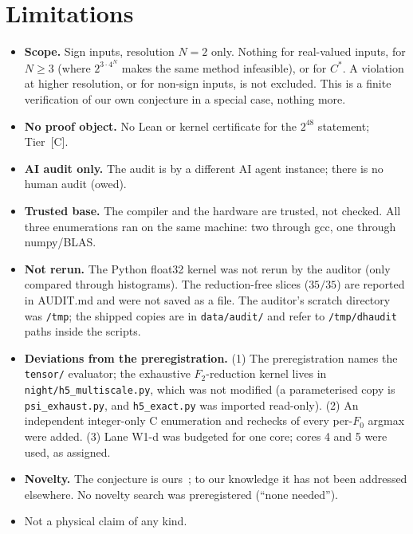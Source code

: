 \documentclass[10pt]{article}
\newcommand{\tier}[1]{\textsf{[#1]}}
\newcommand{\tC}{\tier{C}}
\begin{document}
\section{Limitations}\label{sec:lim}
\begin{itemize}\itemsep=1pt
\item \textbf{Scope.} Sign inputs, resolution $N=2$ only. Nothing for real-valued inputs, for $N\ge3$ (where $2^{3\cdot4^N}$ makes the same method infeasible), or for $C^\ast$. A violation at higher resolution, or for non-sign inputs, is not excluded. This is a finite verification of our own conjecture in a special case, nothing more.
\item \textbf{No proof object.} No Lean or kernel certificate for the $2^{48}$ statement; Tier~\tC{}.
\item \textbf{AI audit only.} The audit is by a different AI agent instance; there is no human audit (owed).
\item \textbf{Trusted base.} The compiler and the hardware are trusted, not checked. All three enumerations ran on the same machine: two through gcc, one through numpy/BLAS.
\item \textbf{Not rerun.} The Python float32 kernel was not rerun by the auditor (only compared through histograms). The reduction-free slices ($35/35$) are reported in AUDIT.md and were not saved as a file. The auditor's scratch directory was \texttt{/tmp}; the shipped copies are in \texttt{data/audit/} and refer to \texttt{/tmp/dhaudit} paths inside the scripts.
\item \textbf{Deviations from the preregistration.} (1) The preregistration names the \texttt{tensor/} evaluator; the exhaustive $F_2$-reduction kernel lives in \texttt{night/h5\_multiscale.py}, which was not modified (a parameterised copy is \texttt{psi\_exhaust.py}, and \texttt{h5\_exact.py} was imported read-only). (2) An independent integer-only C enumeration and rechecks of every per-$F_0$ argmax were added. (3) Lane W1-d was budgeted for one core; cores 4 and 5 were used, as assigned.
\item \textbf{Novelty.} The conjecture is ours~\cite{dh}; to our knowledge it has not been addressed elsewhere. No novelty search was preregistered (``none needed'').
\item Not a physical claim of any kind.
\end{itemize}

\end{document}
